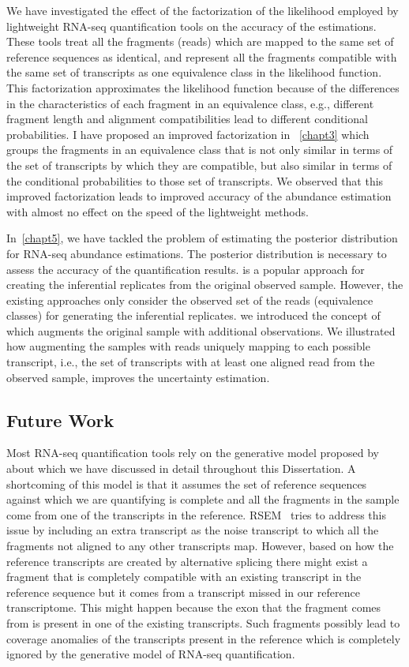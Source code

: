 We have investigated the effect of the factorization of the likelihood employed
by lightweight RNA-seq quantification tools on the accuracy of the estimations. These tools
treat all the fragments (reads) which are mapped to the same set of reference sequences as identical,
and represent all the fragments compatible with the same set of transcripts as one equivalence
class in the likelihood function. 
This factorization approximates the likelihood function because of the differences in the 
characteristics of each fragment in an equivalence class, e.g., different fragment length
and alignment compatibilities lead to different conditional probabilities.
I have proposed an improved factorization in ~\cref{chapt3} which groups the fragments
in an equivalence class that is not only similar in terms of the set of transcripts by which
they are compatible, but also similar in terms of the conditional probabilities to those
set of transcripts. We observed that this improved factorization leads to improved accuracy of 
the abundance estimation with almost no effect on the speed of the lightweight methods.

In~\cref{chapt5}, we have tackled the problem of estimating the posterior distribution for
RNA-seq abundance estimations. The posterior distribution is necessary to assess the accuracy
of the quantification results. \boots is a popular approach for creating the inferential replicates
from the original observed sample. However, the existing \boot approaches only consider the observed
set of the reads (equivalence classes) for generating the inferential replicates. we introduced the 
concept of \aboots which augments the original sample with additional observations. We illustrated 
how augmenting the \boot samples with reads uniquely mapping to each possible transcript, i.e., the 
set of transcripts with at least one aligned read from the observed sample, improves the uncertainty
estimation.

\subsection{Future Work}

Most RNA-seq quantification tools rely on the generative model proposed by~\cite{Li2010RSEM} about
which we have discussed in detail throughout this Dissertation. A shortcoming of this model is that
it assumes the set of reference sequences against which we are quantifying is complete and all the 
fragments in the sample come from one of the transcripts in the reference. RSEM~\cite{Li2010RSEM} tries to 
address this issue by including an extra transcript as the noise transcript to which all the fragments
not aligned to any other transcripts map. However, based on how the reference transcripts
are created by alternative splicing there might exist a fragment that is completely compatible with
an existing transcript in the reference sequence but it comes from a transcript missed in our
reference transcriptome. This might happen because the exon that the fragment comes from is present
in one of the existing transcripts. Such fragments possibly lead to coverage anomalies of the transcripts
present in the reference which is completely ignored by the generative model of RNA-seq quantification.

